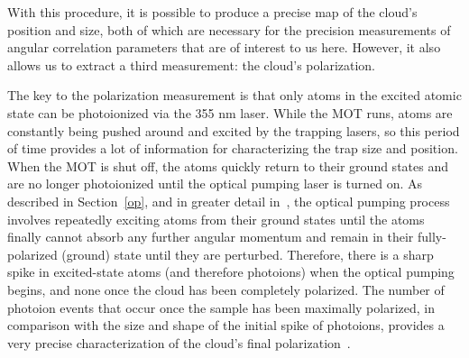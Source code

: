 
With this procedure, it is possible to produce a precise map of the cloud's position and size, both of which are necessary for the precision measurements of angular correlation parameters that are of interest to us here.  However, it also allows us to extract a third measurement:  the cloud's polarization.

The key to the polarization measurement is that only atoms in the excited atomic state can be photoionized via the 355 nm laser.  While the MOT runs, atoms are constantly being pushed around and excited by the trapping lasers, so this period of time provides a lot of information for characterizing the trap size and position.  When the MOT is shut off, the atoms quickly return to their ground states and are no longer photoionized until the optical pumping laser is turned on.  As described in Section~\ref{op}, and in greater detail in~\cite{ben_OP}, the optical pumping process involves repeatedly exciting atoms from their ground states until the atoms finally cannot absorb any further angular momentum and remain in their fully-polarized (ground) state until they are perturbed.  Therefore, there is a sharp spike in excited-state atoms (and therefore photoions) when the optical pumping begins, and none once the cloud has been completely polarized.  The number of photoion events that occur once the sample has been maximally polarized, in comparison with the size and shape of the initial spike of photoions, provides a very precise characterization of the cloud's final polarization~\cite{ben_OP}.




